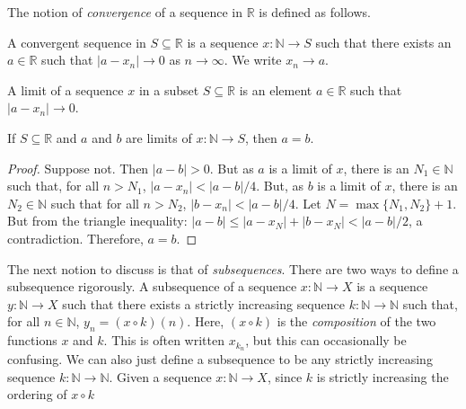         The notion of \textit{convergence} of a sequence
        in $\mathbb{R}$ is defined as follows.
        \begin{definition}
            A convergent sequence in $S\subseteq\mathbb{R}$
            is a sequence $x:\mathbb{N}\rightarrow{S}$
            such that there exists an $a\in\mathbb{R}$
            such that $|a-x_{n}|\rightarrow{0}$ as
            $n\rightarrow\infty$. We write
            $x_{n}\rightarrow{a}$.
        \end{definition}
        \begin{definition}
            A limit of a sequence $x$
            in a subset $S\subseteq\mathbb{R}$ is an
            element $a\in\mathbb{R}$ such that
            $|a-x_{n}|\rightarrow{0}$.
        \end{definition}
        \begin{theorem}
            If $S\subseteq\mathbb{R}$ and $a$ and $b$ are
            limits of $x:\mathbb{N}\rightarrow{S}$,
            then $a=b$.
        \end{theorem}
        \begin{proof}
            Suppose not. Then $|a-b|>0$. But as $a$ is a
            limit of $x$, there is an $N_{1}\in\mathbb{N}$
            such that, for all $n>N_{1}$,
            $|a-x_{n}|<|a-b|/4$. But, as $b$ is a limit
            of $x$, there is an $N_{2}\in\mathbb{N}$
            such that for all $n>N_{2}$,
            $|b-x_{n}|<|a-b|/4$. Let $N=\max\{N_{1},N_{2}\}+1$.
            But from the triangle inequality:
            $|a-b|\leq|a-x_{N}|+|b-x_{N}|<|a-b|/2$, a
            contradiction. Therefore, $a=b$.
        \end{proof}
        The next notion to discuss is that of
        \textit{subsequences}. There are two ways to define
        a subsequence rigorously. A subsequence of a sequence
        $x:\mathbb{N}\rightarrow{X}$ is a sequence 
        $y:\mathbb{N}\rightarrow{X}$ such that there exists
        a strictly increasing sequence
        $k:\mathbb{N}\rightarrow\mathbb{N}$ such that, for all
        $n\in\mathbb{N}$, $y_{n}=(x\circ{k})(n)$. Here,
        $(x\circ{k})$ is the \textit{composition} of
        the two functions $x$ and $k$. This is
        often written $x_{k_{n}}$, but this can occasionally
        be confusing. We can also just define a subsequence
        to be any strictly increasing sequence
        $k:\mathbb{N}\rightarrow\mathbb{N}$. Given a sequence
        $x:\mathbb{N}\rightarrow{X}$, since $k$ is strictly
        increasing the ordering of $x\circ{k}$
